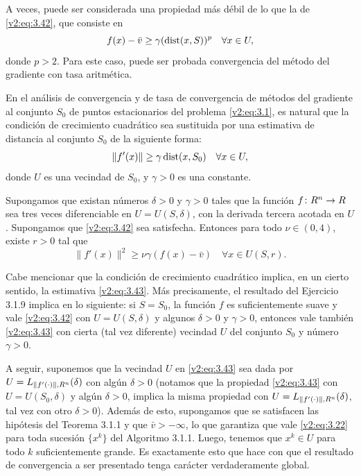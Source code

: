 A veces, puede ser considerada una propiedad más débil de lo que la de \eqref{v2:eq:3.42}, que consiste en
\[
    f(x) - \bar{v} \ge \gamma (\operatorname{dist}(x, S))^p \quad \forall x \in U,
\]
donde $p > 2$. Para este caso, puede ser probada convergencia del método del gradiente con tasa aritmética.

En el análisis de convergencia y de tasa de convergencia de métodos del gradiente al conjunto $S_0$ de puntos estacionarios del problema \eqref{v2:eq:3.1}, es natural que la condición de crecimiento cuadrático sea sustituida por una estimativa de distancia al conjunto $S_0$ de la siguiente forma:
\begin{equation}
    \|f'(x)\| \ge \gamma \operatorname{dist}(x, S_0) \quad \forall x \in U,
    \label{v2:eq:3.43}
\end{equation}
donde $U$ es una vecindad de $S_0$, y $\gamma > 0$ es una constante.


Supongamos que existan números $\delta > 0$ y $\gamma > 0$ tales que la función $f \colon R^n \to R$ sea tres veces diferenciable en $U = U(S, \delta)$, con la derivada tercera acotada en $U$. Supongamos que \eqref{v2:eq:3.42} sea satisfecha. Entonces para todo $\nu \in (0, 4)$, existe $r > 0$ tal que
\[
    \|f'(x)\|^2 \ge \nu\gamma(f(x) - \bar{v}) \quad \forall x \in U(S, r).
\]

Cabe mencionar que la condición de crecimiento cuadrático implica, en un cierto sentido, la estimativa \eqref{v2:eq:3.43}. Más precisamente, el resultado del Ejercicio 3.1.9 implica en lo siguiente: si $S = S_0$, la función $f$ es suficientemente suave y vale \eqref{v2:eq:3.42} con $U = U(S, \delta)$ y algunos $\delta > 0$ y $\gamma > 0$, entonces vale también \eqref{v2:eq:3.43} con cierta (tal vez diferente) vecindad $U$ del conjunto $S_0$ y número $\gamma > 0$.

A seguir, suponemos que la vecindad $U$ en \eqref{v2:eq:3.43} sea dada por $U = L_{\|f'(\cdot)\|, R^n}(\delta)$ con algún $\delta > 0$ (notamos que la propiedad \eqref{v2:eq:3.43} con $U = U(S_0, \delta)$ y algún $\delta > 0$, implica la misma propiedad con $U = L_{\|f'(\cdot)\|, R^n}(\delta)$, tal vez con otro $\delta > 0$). Además de esto, supongamos que se satisfacen las hipótesis del Teorema 3.1.1 y que $\bar{v} > -\infty$, lo que garantiza que vale \eqref{v2:eq:3.22} para toda sucesión $\{x^k\}$ del Algoritmo 3.1.1. Luego, tenemos que $x^k \in U$ para todo $k$ suficientemente grande. Es exactamente esto que hace con que el resultado de convergencia a ser presentado tenga carácter verdaderamente global.

